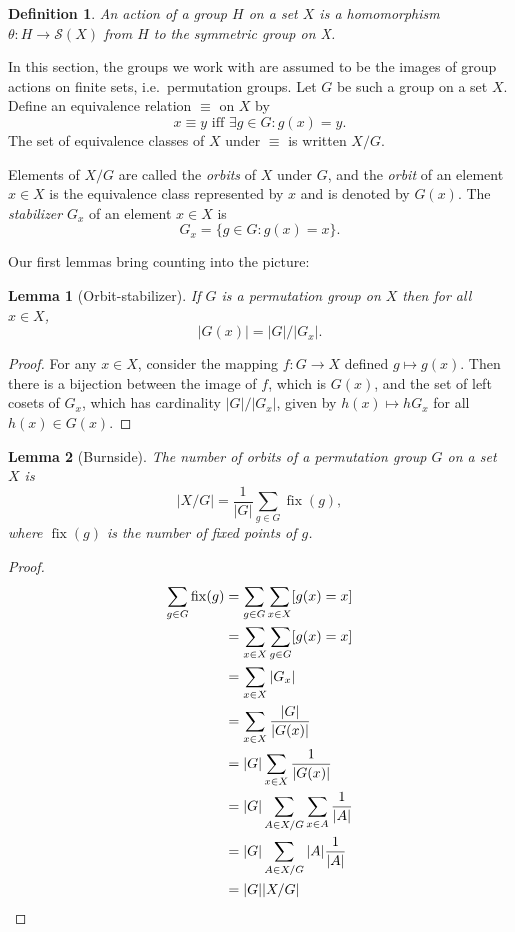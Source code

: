 \documentclass[12pt]{article}
\theoremstyle{plain}
\newtheorem{lem}{Lemma}
\newtheorem{defin}{Definition}
\DeclareMathOperator{\fix}{fix}
\begin{document}
\begin{defin}
An \emph{action} of a group \( H \) on a set \( X \) is a homomorphism \( \theta: H \rightarrow \mathcal{S}(X) \) from \( H \) to the symmetric group on X.
\end{defin}

In this section, the groups we work with are assumed to be the images of group actions on finite sets, i.e.\ permutation groups.
Let \( G \) be such a group on a set \( X \).
Define an equivalence relation \( \equiv \) on \( X \) by
\[ x \equiv y \text{ iff } \exists g \in G : g(x) = y. \]
The set of \hypertarget{quotient}{equivalence classes} of \( X \) under \( \equiv \) is written \( X / G \).

Elements of \( X / G \) are called the \emph{orbits} of \( X \) under \( G \),
and the \emph{orbit} of an element \( x \in X \) is the equivalence class represented by \(x\) and is denoted by \( G(x) \).
The \emph{stabilizer} \( G_x \) of an element \( x \in X \) is
 \[ G_x = \{ g \in G : g(x) = x \} . \]

\vspace{10px}

Our first lemmas bring counting into the picture:
\begin{lem}[Orbit-stabilizer]
\label{lem:orbit}
If \( G \) is a permutation group on \( X \) then for all \(x \in X\),
\[ |G(x)| = |G|/|G_x|. \]
\end{lem}
\begin{proof}
 For any \( x \in X \), consider the mapping \( f: G \rightarrow X \) defined \( g \mapsto g(x) \).
Then there is a bijection between the image of \( f \), which is  \(G(x) \),
and the set of left cosets of \( G_x \), which has cardinality \( |G| / |G_x| \),
given by \( h(x) \mapsto hG_x \) for all \( h(x) \in G(x) \).
\end{proof}

\begin{lem}[Burnside]
\label{lem:burnside}
The number of orbits of a permutation group \( G \) on a set \( X \) is
\[ | X / G | = \frac{1}{|G|} \sum_{g \in G} \fix(g), \]
where \( \fix(g) \) is the number of fixed points of \( g \).
\end{lem}
\begin{proof}
\begin{align*}
\sum_{g \in G} \fix(g) &= \sum_{g \in G} \sum_{x \in X} [g(x) = x] \\
&= \sum_{x \in X} \sum _{g \in G} [g(x) = x] \\
&= \sum_{x \in X} | G_x |\\
&= \sum_{x \in X} \frac{|G|}{|G(x)|} \\
&= |G| \sum_{x \in X} \frac{1}{|G(x)|} \\
&= |G| \sum_{A \in X/G} \sum_{x \in A} \frac{1}{|A|} \\
&= |G| \sum_{A \in X/G} |A| \frac{1}{|A|} \\
&= |G| |X / G| \qedhere
\end{align*}
\end{proof}
\end{document}
